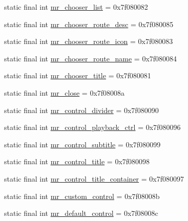 \begin{CompactItemize}
\item 
static final int \hyperlink{classandroid_1_1support_1_1fragment_1_1_r_1_1id_df9f3bdf33c1c669ab2f2a072cb1e43c}{mr\_\-chooser\_\-list} = 0x7f080082
\item 
static final int \hyperlink{classandroid_1_1support_1_1fragment_1_1_r_1_1id_58751fcdfeef7c6d5ed50d48f7d6ce01}{mr\_\-chooser\_\-route\_\-desc} = 0x7f080085
\item 
static final int \hyperlink{classandroid_1_1support_1_1fragment_1_1_r_1_1id_abf2f501c189cd1ff19fe9c11a88033b}{mr\_\-chooser\_\-route\_\-icon} = 0x7f080083
\item 
static final int \hyperlink{classandroid_1_1support_1_1fragment_1_1_r_1_1id_0a156bbe5fdd1eecc0db77ac7addecc2}{mr\_\-chooser\_\-route\_\-name} = 0x7f080084
\item 
static final int \hyperlink{classandroid_1_1support_1_1fragment_1_1_r_1_1id_78640bfb63b8234139235afb536b801e}{mr\_\-chooser\_\-title} = 0x7f080081
\item 
static final int \hyperlink{classandroid_1_1support_1_1fragment_1_1_r_1_1id_c89c5c322c05a780d7e04c3293414f77}{mr\_\-close} = 0x7f08008a
\item 
static final int \hyperlink{classandroid_1_1support_1_1fragment_1_1_r_1_1id_713b02e0b4029aab52d519b7860240f7}{mr\_\-control\_\-divider} = 0x7f080090
\item 
static final int \hyperlink{classandroid_1_1support_1_1fragment_1_1_r_1_1id_a28e6cc3384772d40f10d323ee217900}{mr\_\-control\_\-playback\_\-ctrl} = 0x7f080096
\item 
static final int \hyperlink{classandroid_1_1support_1_1fragment_1_1_r_1_1id_2c738fee9d2e158df6a35d963d4a786a}{mr\_\-control\_\-subtitle} = 0x7f080099
\item 
static final int \hyperlink{classandroid_1_1support_1_1fragment_1_1_r_1_1id_0d310ae82a0d3ac7a09a2f919b1e585d}{mr\_\-control\_\-title} = 0x7f080098
\item 
static final int \hyperlink{classandroid_1_1support_1_1fragment_1_1_r_1_1id_d81eb588b52efe95406924dcd976c78b}{mr\_\-control\_\-title\_\-container} = 0x7f080097
\item 
static final int \hyperlink{classandroid_1_1support_1_1fragment_1_1_r_1_1id_e98392cd2b7f223595f969a92e975750}{mr\_\-custom\_\-control} = 0x7f08008b
\item 
static final int \hyperlink{classandroid_1_1support_1_1fragment_1_1_r_1_1id_20e117d7581faba9a1c24b177378da02}{mr\_\-default\_\-control} = 0x7f08008c
\item 

\end{CompactItemize}
